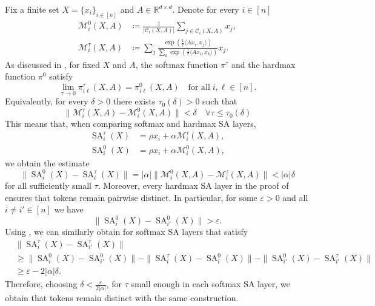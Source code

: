 \documentclass[pdflatex,sn-mathphys-num]{sn-jnl}%
\theoremstyle{thmstyleone}%
\theoremstyle{thmstyletwo}%
\theoremstyle{thmstylethree}%
\numberwithin{equation}{section}
\newcommand{\R}{\mathbb{R}}
\DeclareMathOperator{\SA}{\mathrm{SA}}
\begin{document}
Fix a finite set $X = \{ x_i \}_{i\in [n]}$ and $A \in \R^{d\times d}$. Denote for every $i\in [n]$
\begin{align*}
    \mathcal{M}_i^0 (X, A) &\coloneqq \frac{1}{|\mathcal{C}_i(X, A)|} \sum_{j\in \mathcal{C}_i(X, A)}x_j, \\
    \mathcal{M}_i^\tau (X, A)  &\coloneqq  \sum_{j}\frac{\exp{\left(\frac{1}{\tau}\langle A x_i, x_j \rangle\right)}}{\sum_{k} \exp{\left(\frac{1}{\tau}\langle A x_i, x_k \rangle\right)}} x_j.
\end{align*}
As discussed in , for fixed $X$ and $A$, the softmax function $\pi^\tau$ and the hardmax function $\pi^0$ satisfy \cite{elfadelSoftmax1993}
$$
\lim_{\tau \to 0} \pi_{i\ell}^\tau (X, A) = \pi_{i \ell}^0 (X, A) \quad \text{for all} \; i,\ell \in [n].
$$
Equivalently, for every $\delta > 0$ there exists $\tau_0(\delta) > 0$ such that
$$
    \| \mathcal{M}_i^\tau (X, A) -\mathcal{M}_i^0 (X, A)  \| < \delta \quad \forall \tau \leq \tau_0(\delta)
$$
This means that, when comparing softmax and hardmax SA layers,
\begin{align*}
    \SA^{\tau}_i(X) &= \rho x_i + \alpha \mathcal{M}^\tau_i (X,A), \\
    \SA^{0}_i(X) &= \rho x_i + \alpha \mathcal{M}^0_i(X, A),
\end{align*}
we obtain the estimate
\begin{equation}\label{eq:sm-hm-estimate}
    \|\SA^{0}_i(X) - \SA^{\tau}_i(X) \| = | \alpha | \| \mathcal{M}_i^0(X,A) - \mathcal{M}_i^\tau(X,A) \| < |\alpha| \delta
\end{equation}
for all sufficiently small $\tau$. Moreover, every hardmax SA layer in the proof of  ensures that tokens remain pairwise distinct. In particular, for some $\varepsilon > 0$ and all $i\neq i'\in [n]$ we have
$$
    \| \SA^{0}_i(X) - \SA^{0}_{i'}(X) \| > \varepsilon.
$$
Using , we can similarly obtain for softmax SA layers that satisfy
\begin{align}\nonumber
    &\| \SA^{\tau}_i(X) - \SA^{\tau}_{i'}(X) \| \\ \nonumber
    &\geq \| \SA^{0}_i(X) - \SA^{0}_{i'}(X) \| - \| \SA^{\tau}_i(X) - \SA^{0}_i(X) \| - \|\SA^{0}_{i'}(X) - \SA^{\tau}_{i'}(X) \| \\ \nonumber
    &\geq \varepsilon - 2 |\alpha|\delta.
\end{align}
Therefore, choosing $\delta < \frac{\varepsilon}{2 |\alpha|}$, for $\tau$ small enough in each softmax SA layer, we obtain that tokens remain distinct with the same construction. 
\end{document}
